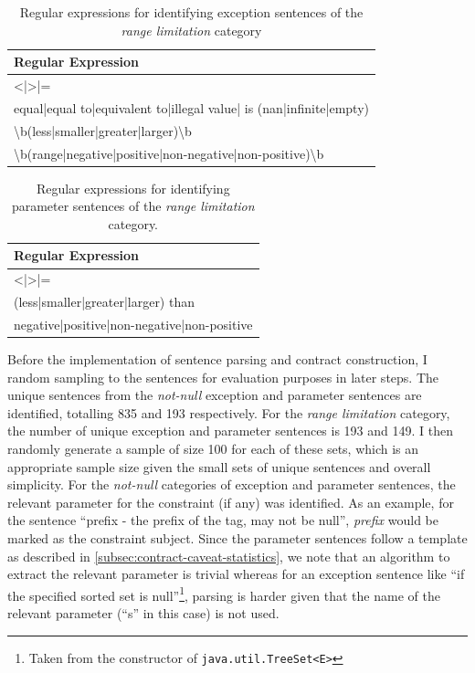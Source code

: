 \begin{table}[h]
	\centering
	\begin{tabular}{|l|}
		\hline
		\textbf{Regular Expression} \\ \hline
		\textless{}|\textgreater{}|= \\ \hline
		equal|equal to|equivalent to|illegal value| is (nan|infinite|empty) \\ \hline
		\textbackslash{}b(less|smaller|greater|larger)\textbackslash{}b \\ \hline
		\textbackslash{}b(range|negative|positive|non-negative|non-positive)\textbackslash{}b \\ \hline
	\end{tabular}
	\caption{Regular expressions for identifying exception sentences of the \textit{range limitation} category}
	\label{tab:except-range}
\end{table}
\clearpage
\begin{table}[h]
	\centering
	\begin{tabular}{|l|}
		\hline
		\textbf{Regular Expression} \\ \hline
		\textless{}|\textgreater{}|= \\ \hline
		(less|smaller|greater|larger) than \\ \hline
		negative|positive|non-negative|non-positive \\ \hline
	\end{tabular}
	\caption{Regular expressions for identifying parameter sentences of the \textit{range limitation} category.}
	\label{tab:param-range}
\end{table}


Before the implementation of sentence parsing and contract construction, I random sampling to the sentences for evaluation purposes in later steps. The unique sentences from the \textit{not-null} exception and parameter sentences are identified, totalling 835 and 193 respectively. For the \textit{range limitation} category, the number of unique exception and parameter sentences is 193 and 149. I then randomly generate a sample of size 100 for each of these sets, which is an appropriate sample size given the small sets of unique sentences and overall simplicity. For the \textit{not-null} categories of exception and parameter sentences, the relevant parameter for the constraint (if any) was identified. As an example, for the sentence ``prefix - the prefix of the tag, may not be null'', \textit{prefix} would be marked as the constraint subject. Since the parameter sentences follow a template as described in \ref{subsec:contract-caveat-statistics}, we note that an algorithm to extract the relevant parameter is trivial whereas for an exception sentence like ``if the specified sorted set is null''\footnote{Taken from the constructor of \lstinline{java.util.TreeSet<E>}}, parsing is harder given that the name of the relevant parameter (``s'' in this case) is not used. \bigbreak

